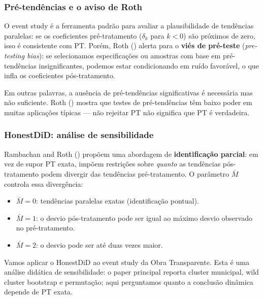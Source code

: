 \documentclass[
]{article}
\providecommand{\tightlist}{%
  \setlength{\itemsep}{0pt}\setlength{\parskip}{0pt}}
\begin{document}
\subsubsection{Pré-tendências e o aviso de Roth}\label{pruxe9-tenduxeancias-e-o-aviso-de-roth}

O event study é a ferramenta padrão para avaliar a plausibilidade de tendências paralelas: se os coeficientes pré-tratamento (\(\delta_k\) para \(k < 0\)) são próximos de zero, isso é consistente com PT. Porém, Roth () alerta para o \textbf{viés de pré-teste} (\emph{pre-testing bias}): se selecionamos especificações ou amostras com base em pré-tendências insignificantes, podemos estar condicionando em ruído favorável, o que infla os coeficientes pós-tratamento.

Em outras palavras, a ausência de pré-tendências significativas é necessária mas não suficiente. Roth () mostra que testes de pré-tendências têm baixo poder em muitas aplicações típicas --- não rejeitar PT não significa que PT é verdadeira.

\subsubsection{HonestDiD: análise de sensibilidade}\label{honestdid-anuxe1lise-de-sensibilidade}

Rambachan and Roth () propõem uma abordagem de \textbf{identificação parcial}: em vez de supor PT exata, impõem restrições sobre \emph{quanto} as tendências pós-tratamento podem divergir das tendências pré-tratamento. O parâmetro \(\bar{M}\) controla essa divergência:

\begin{itemize}
\tightlist
\item
  \(\bar{M} = 0\): tendências paralelas exatas (identificação pontual).
\item
  \(\bar{M} = 1\): o desvio pós-tratamento pode ser igual ao máximo desvio observado no pré-tratamento.
\item
  \(\bar{M} = 2\): o desvio pode ser até duas vezes maior.
\end{itemize}

Vamos aplicar o HonestDiD ao event study da Obra Transparente. Esta é uma análise didática de sensibilidade: o paper principal reporta cluster municipal, wild cluster bootstrap e permutação; aqui perguntamos quanto a conclusão dinâmica depende de PT exata.
\end{document}
